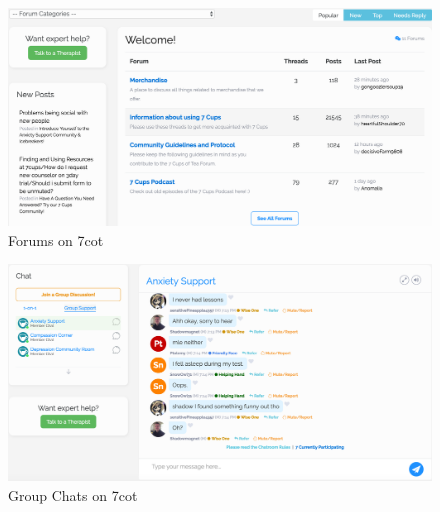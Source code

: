 \begin{figure}
	\centering %
	\includegraphics[width=5in]{Forums.png} %
	\caption{Forums on 7cot} 
	\label{fig:forum}
\end{figure}

\begin{figure}
	\centering %
	\includegraphics[width=5in]{Group.png} %
	\caption{Group Chats on 7cot} 
	\label{fig:group}
\end{figure}

